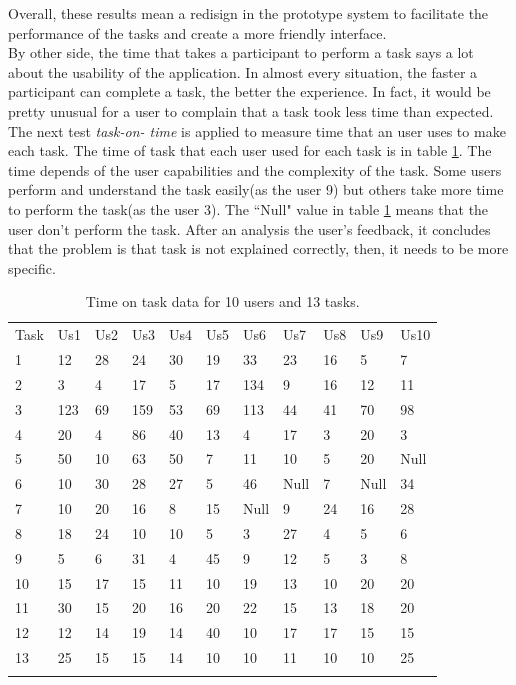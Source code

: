 Overall, these results mean a redisign in the
prototype system to facilitate the performance of the tasks 
and create a more friendly interface.\\ 
By other side, the time that takes a participant to perform a task
says a lot about the usability of the application. In almost every
situation, the faster a participant can complete a task, the better
the experience. In fact, it would be pretty unusual for a user to
complain that a task took less time than
expected\cite{albert2013measuring}.\\  The next test \textit{task-on-
time} is applied to measure time that an user uses to make each task.
The time of task that each user used for each task is in table
\ref{tab:datausers}. The time depends of the user capabilities and the
complexity of the task. Some users perform and understand the task
easily(as the user 9) but others take more time to perform the task(as
the user 3). The ``Null" value in table \ref{tab:datausers} means that
the user don't perform the task. After an analysis the user's
feedback, it concludes that the problem is that task is not explained
correctly, then, it needs to be more specific.
\begin{table}
\centering
\small
\captionsetup{font=footnotesize}
\caption{Time on task data for 10 users and 13 tasks. }
\label{tab:datausers}  
\begin{tabular}{lllllllllll}
\hline\noalign{\smallskip}
Task  & Us1  & Us2 & Us3 & Us4 & Us5 & Us6 & Us7 & Us8 & Us9 & Us10 \\
\noalign{\smallskip}\hline\noalign{\smallskip}
1 & 12  & 28 & 24 & 30 & 19 & 33  & 23 & 16 & 5  & 7 \\
2 & 3   & 4  & 17 & 5  & 17 & 134 & 9  & 16 & 12 & 11 \\
3 & 123 & 69 & 159& 53 & 69 & 113 & 44 & 41 & 70 & 98 \\
4 & 20  & 4  & 86 & 40 & 13 & 4   & 17 & 3  & 20 & 3 \\
5 & 50  & 10 & 63 & 50 & 7  & 11  & 10 & 5  & 20 & Null \\
6 & 10  & 30 & 28 & 27 & 5  & 46  & Null  & 7  & Null  & 34 \\
7 & 10  & 20 & 16 & 8  & 15 & Null & 9  & 24 & 16 & 28 \\
8 & 18  & 24 & 10 & 10 & 5  & 3   & 27 & 4  & 5  & 6 \\
9 & 5   & 6  & 31 & 4  & 45 & 9   & 12 & 5  & 3  & 8 \\
10 & 15 & 17 & 15 & 11 & 10 & 19  & 13 & 10 & 20 & 20 \\
11 & 30 & 15 & 20 & 16 & 20 & 22  & 15 & 13 & 18 & 20 \\
12 & 12 & 14 & 19 & 14 & 40 & 10  & 17 & 17 & 15 & 15 \\
13 & 25 & 15 & 15 & 14 & 10 & 10  & 11 & 10 & 10 & 25 \\
\noalign{\smallskip}\hline
\end{tabular}
\end{table}

